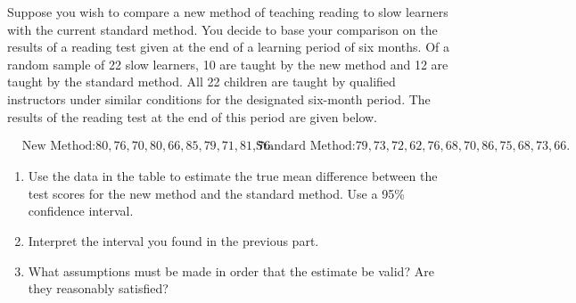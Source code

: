 
\begin{exercise}

Suppose you wish to compare a new method of teaching reading to slow
learners with the current standard method. You decide to base your
comparison on the results of a reading test given at the end of a learning
period of six months. Of a random sample of 22 slow learners, 10 are taught
by the new method and 12 are taught by the standard method.
All 22 children are taught by qualified instructors under similar
conditions for the designated six-month period. The results of the reading
test at the end of this period are given below.

\begin{align*}
    &\text{New Method:} 80, 76, 70, 80, 66, 85, 79, 71, 81, 76.
    &\text{Standard Method:} 79, 73, 72, 62, 76, 68, 70, 86, 75, 68, 73, 66.
\end{align*}

\begin{enumerate}[label = (\alph*)]
    \item Use the data in the table to estimate the true mean difference
    between the test scores for the new method and the standard method.
    Use a 95\% confidence interval.
    \item Interpret the interval you found in the previous part.
    \item What assumptions must be made in order that the estimate be valid?
    Are they reasonably satisfied?
\end{enumerate}

\end{exercise}


\begin{solution}

\phantom{}

\end{solution}

